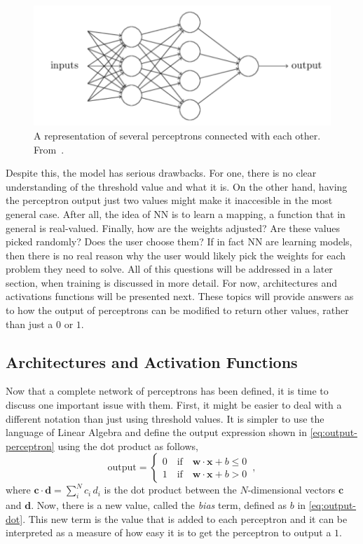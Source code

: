 \begin{figure}
    \centering
    \includegraphics[scale=0.4]{figuras/capitulo-3/multi-perceptron}
    \caption{A representation of several perceptrons connected with each other. From~\cite{nielsenNeuralNetworksDeep2015}.}
    \label{fig:multi-perceptron}
\end{figure}

Despite this, the model has serious drawbacks. For one, 
there is no clear understanding of the threshold value and what it is. On the other hand, 
having the perceptron output just two values might make it inaccesible in the most general 
case. After all, the idea of NN is to learn a mapping, a function that in general is 
real-valued. Finally, how are the weights adjusted? Are these values picked randomly? Does 
the user choose them? If in fact NN are learning models, then there is no real reason why 
the user would likely pick the weights for each problem they need to solve. All of this 
questions will be addressed in a later section, when training is discussed in more detail.
For now, architectures and activations functions will be presented next. These topics will
provide answers as to how the output of perceptrons can be modified to return other values,
rather than just a \(0\) or \(1\).

\subsection{Architectures and Activation Functions}
Now that a complete network of perceptrons has been defined, it is time to discuss one 
important issue with them. First, it might be easier to deal with a different notation 
than just using threshold values. It is simpler to use the language of Linear Algebra 
and define the output expression shown in \autoref{eq:output-perceptron} using the dot product as follows,
\begin{equation}
    \text{output} = \begin{cases}
        0 \quad \text{if} \quad \mathbf{w} \cdot \mathbf{x} + b \leq 0 \\
        1 \quad \text{if} \quad \mathbf{w} \cdot \mathbf{x} + b > 0
    \end{cases}
    \, ,
    \label{eq:output-dot}
\end{equation}
where \(\mathbf{c} \cdot \mathbf{d} = \sum_{i}^{N} c_i \, d_i\) is the dot product between 
the $N$-dimensional vectors \(\mathbf{c}\) and \(\mathbf{d}\). Now, there is a new value, 
called the \emph{bias} term, defined as \(b\) in \autoref{eq:output-dot}. This new term is 
the value that is added to each perceptron and it can be interpreted as a measure of how 
easy it is to get the perceptron to output a \(1\).

